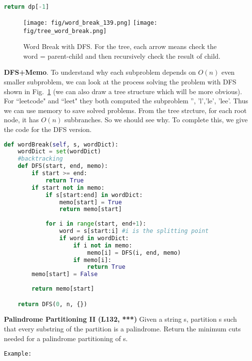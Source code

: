 \documentclass[../main.tex]{subfiles}
\begin{document}
\begin{examples}[resume]
\begin{lstlisting}[language=Python]
    return dp[-1]
\end{lstlisting}
\begin{figure}[h]
    \centering
    \texttt{[image: fig/word\_break\_139.png]}
    \texttt{[image: fig/tree\_word\_break.png]}
    \caption{Word Break with DFS. For the tree, each arrow means check the word = parent-child and then recursively check the result of child. }
    \label{fig:word_break_dfs}
\end{figure}
\textbf{DFS+Memo}. To understand why each subproblem depends on $O(n)$ even smaller subproblem, we can look at the process solving the problem with DFS shown in Fig.~\ref{fig:word_break_dfs} (we can also draw a tree structure which will be more obvious). For ``leetcode" and ``leet" they both computed the subproblem '', 'l','le', 'lee'. Thus we can use memory to save solved problems. From the tree strcture, for each root node, it has $O(n)$ subbranches. So we should see why. To complete this, we give the code for the DFS version.
\begin{lstlisting}[language=Python]
def wordBreak(self, s, wordDict):
    wordDict = set(wordDict)
    #backtracking
    def DFS(start, end, memo):
        if start >= end:
            return True
        if start not in memo:
            if s[start:end] in wordDict:
                memo[start] = True
                return memo[start]
        
            for i in range(start, end+1):
                word = s[start:i] #i is the splitting point
                if word in wordDict:
                    if i not in memo:
                        memo[i] = DFS(i, end, memo)
                    if memo[i]:
                        return True
        memo[start] = False
                
        return memo[start]

    return DFS(0, n, {})
\end{lstlisting}
 \item \textbf{ Palindrome Partitioning II (L132, ***)} Given a string s, partition s such that every substring of the partition is a palindrome. Return the minimum cuts needed for a palindrome partitioning of s.
\begin{lstlisting}[numbers=none]
Example:


\end{lstlisting}
\end{examples}
\end{document}
